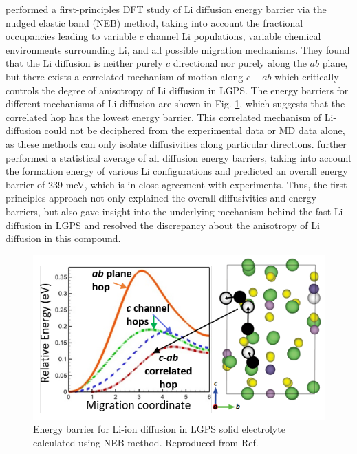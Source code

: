 \documentclass[../main.tex]{subfiles}
\begin{document}
\citeauthor{Bhandari2016} performed a first-principles DFT study of Li diffusion energy barrier via the nudged elastic band (NEB) method, taking into account the fractional occupancies leading to variable $c$ channel Li populations, variable chemical environments surrounding Li, and all possible migration mechanisms.\cite{Bhandari2016}  They found that the Li diffusion is neither purely $c$ directional nor purely along the $ab$ plane, but there exists a correlated mechanism of motion along $c-ab$ which critically controls the degree of anisotropy of Li diffusion in LGPS. The energy barriers for different mechanisms of Li-diffusion are shown in Fig. \ref{fig:lgps}, which suggests that the correlated hop has the lowest energy barrier. This correlated mechanism of Li-diffusion could not be deciphered from the experimental data or MD data alone, as these methods can only isolate diffusivities along particular directions. \citeauthor{Bhandari2016} further performed a statistical average of all diffusion energy barriers, taking into account the formation energy of various Li configurations and predicted an overall energy barrier of 239 meV, which is in close agreement with experiments.\cite{Kamaya2011} Thus, the first-principles approach not only explained the overall diffusivities and energy barriers, but also gave insight into the underlying mechanism behind the fast Li diffusion in LGPS and resolved the discrepancy about the anisotropy of Li diffusion in this compound.

\begin{figure}
    \centering
    \includegraphics[scale=1.2]{figures/lgps.png}
    \caption{Energy barrier for Li-ion diffusion in LGPS solid electrolyte calculated using NEB method. Reproduced from Ref. }
    \label{fig:lgps}
\end{figure}
\end{document}
